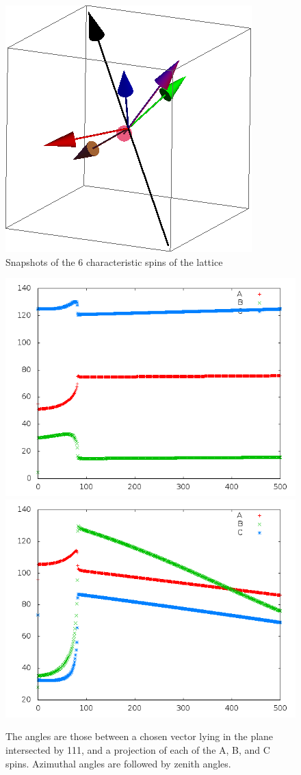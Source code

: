 \documentclass{article}
\begin{document}
\begin{figure}[ht]
\includegraphics[scale=0.27]{4S000to005R.png}
\caption{Snapshots of the 6 characteristic spins of the lattice}
\end{figure}
\begin{figure}
\centering
\includegraphics[scale=0.5]{azim000to005R.png}
\includegraphics[scale=0.5]{zen000to005R.png}
\caption{The angles are those between a chosen vector lying in the plane intersected by 111,
and a projection of each of the A, B, and C spins. Azimuthal angles are followed by zenith angles.}
\end{figure}
\end{document}
